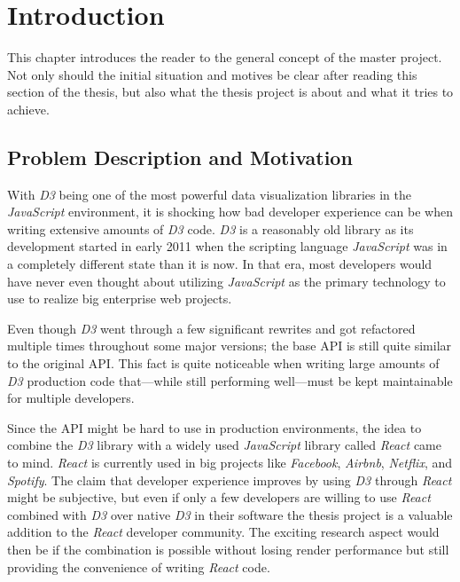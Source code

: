 \chapter{Introduction}
\label{cha:Introduction}

This chapter introduces the reader to the general concept of the master project. Not only should the initial situation and motives be clear after reading this section of the thesis, but also what the thesis project is about and what it tries to achieve.

\section{Problem Description and Motivation}

With \emph{D3} being one of the most powerful data visualization libraries in the \emph{JavaScript} environment, it is shocking how bad developer experience can be when writing extensive amounts of \emph{D3} code. \emph{D3} is a reasonably old library as its development started in early 2011 when the scripting language \emph{JavaScript} was in a completely different state than it is now. In that era, most developers would have never even thought about utilizing \emph{JavaScript} as the primary technology to use to realize big enterprise web projects. 

Even though \emph{D3} went through a few significant rewrites and got refactored multiple times throughout some major versions; the base API is still quite similar to the original API. This fact is quite noticeable when writing large amounts of \emph{D3} production code that---while still performing well---must be kept maintainable for multiple developers.

Since the API might be hard to use in production environments, the idea to combine the \emph{D3} library with a widely used \emph{JavaScript} library called \emph{React} came to mind. \emph{React} is currently used in big projects like \emph{Facebook}, \emph{Airbnb}, \emph{Netflix}, and \emph{Spotify}. The claim that developer experience improves by using \emph{D3} through \emph{React} might be subjective, but even if only a few developers are willing to use \emph{React} combined with \emph{D3} over native \emph{D3} in their software the thesis project is a valuable addition to the \emph{React} developer community. The exciting research aspect would then be if the combination is possible without losing render performance but still providing the convenience of writing \emph{React} code.

